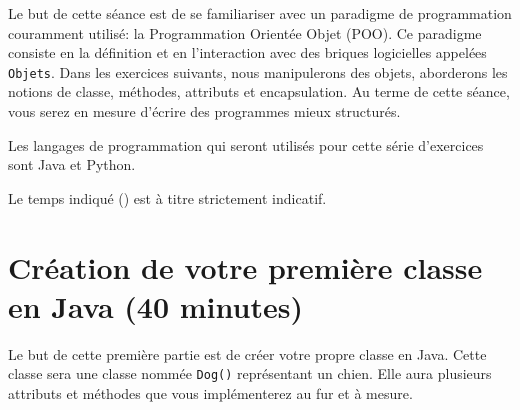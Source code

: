 




\ShowSolutionfalse
\ShowConseiltrue
\titre
{}

Le but de cette séance est de se familiariser avec un paradigme de programmation couramment utilisé: la Programmation Orientée Objet (POO). Ce paradigme consiste en la définition et en l'interaction avec des briques logicielles appelées \lstinline{Objets}. Dans les exercices suivants, nous manipulerons des objets, aborderons les notions de classe, méthodes, attributs et encapsulation. Au terme de cette séance, vous serez en mesure d'écrire des programmes mieux structurés.

Les langages de programmation qui seront utilisés pour cette série d'exercices sont Java et Python.

Le temps indiqué (\faClock) est à titre strictement indicatif.

\section{Création de votre première classe en Java (40 minutes)}

Le but de cette première partie est de créer votre propre classe en Java. Cette classe sera une classe nommée \lstinline{Dog()} représentant un chien. Elle aura plusieurs attributs et méthodes que vous implémenterez au fur et à mesure.
\\

